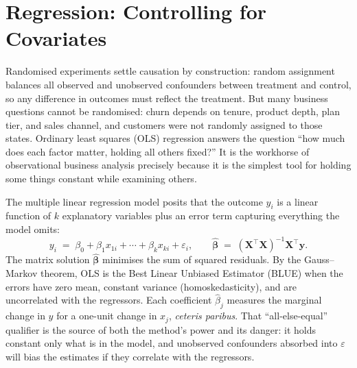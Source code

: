\section{Regression: Controlling for Covariates}\label{sec:regression}

Randomised experiments settle causation by construction: random assignment balances all
observed and unobserved confounders between treatment and control, so any difference in
outcomes must reflect the treatment. But many business questions cannot be randomised:
churn depends on tenure, product depth, plan tier, and sales channel, and customers were not
randomly assigned to those states. Ordinary least squares (OLS) regression answers the
question ``how much does each factor matter, holding all others fixed?'' It is the
workhorse of observational business analysis precisely because it is the simplest tool for
holding some things constant while examining others.

The multiple linear regression model posits that the outcome \(y_i\) is a linear function
of \(k\) explanatory variables plus an error term capturing everything the model omits:
\begin{equation}\label{eq:ols}
  y_i \;=\; \beta_0 + \beta_1 x_{1i} + \cdots + \beta_k x_{ki} + \varepsilon_i,
  \qquad
  \hat{\boldsymbol{\beta}} \;=\; (\mathbf{X}^{\!\top}\mathbf{X})^{-1}\mathbf{X}^{\!\top}\mathbf{y}.
\end{equation}
The matrix solution \(\hat{\boldsymbol{\beta}}\) minimises the sum of squared residuals. By
the Gauss--Markov theorem, OLS is the Best Linear Unbiased Estimator (BLUE) when the errors
have zero mean, constant variance (homoskedasticity), and are uncorrelated with the
regressors. Each coefficient \(\hat{\beta}_j\) measures the marginal change in \(y\) for a
one-unit change in \(x_j\), \emph{ceteris paribus}. That ``all-else-equal'' qualifier is the
source of both the method's power and its danger: it holds constant only what is in the
model, and unobserved confounders absorbed into \(\varepsilon\) will bias the estimates if
they correlate with the regressors.

